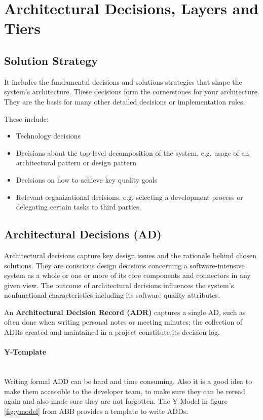\section{Architectural Decisions, Layers and Tiers}

\subsection{Solution Strategy}
It includes the fundamental decisions and solutions strategies that shape the system's architecture. These decisions form the cornerstones for your architecture. They are the basis for many other detailed decisions or implementation rules.

These include:
\begin{itemize}
  \item Technology decisions
  \item Decisions about the top-level decomposition of the system, e.g. usage of an architectural pattern or design pattern
  \item Decisions on how to achieve key quality goals
  \item Relevant organizational decisions, e.g. selecting a development process or delegating certain tasks to third parties.
\end{itemize}

\subsection{Architectural Decisions (AD)}
Architectural decisions capture key design issues and the rationale behind chosen solutions. They are conscious design decisions concerning a software-intensive system as a whole or one or more of its core components and connectors in any given view. The outcome of architectural decisions influences the system’s nonfunctional characteristics including its software quality attributes.

An \textbf{Architectural Decision Record (ADR)} captures a single AD, such as often done when writing personal notes or meeting minutes; the collection of ADRs created and maintained in a project constitute its decision log.

\paragraph{Y-Template} \hfill \\
Writing formal ADD can be hard and time consuming. Also it is a good idea to make them accessible to the developer team, to make sure they can be reread again and also made sure they are not forgotten. The Y-Model in figure \ref{fig:ymodel} from ABB provides a template to write ADDs.

